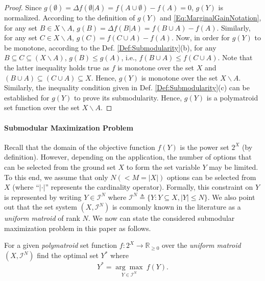 \documentclass[conference]{IEEEtran}
\newcommand{\R}{\mathbb{R}}
\begin{document}
\begin{proof}
Since $g(\emptyset)=\Delta f(\emptyset \vert A) = f(A\cup\emptyset)-f(A)=0$, $g(Y)$ is normalized. 
According to the definition of $g(Y)$ and \eqref{Eq:MarginalGainNotation}, for any set $B\in X \backslash A$, $g(B) = \Delta f(B\vert A) = f(B \cup A)-f(A)$. Similarly, for any set $C\in X\backslash A$, $g(C)=f(C\cup A)-f(A)$. 
Now, in order for $g(Y)$ to be monotone, according to the Def. \ref{Def:Submodularity}(b), for any $B\subseteq C\subseteq (X\backslash A)$,  $g(B)\leq g(A)$, i.e., $f(B\cup A) \leq f(C\cup A)$. Note that the latter inequality holds true as $f$ is monotone over the set $X$ and $(B\cup A) \subseteq (C\cup A) \subseteq X$. Hence, $g(Y)$ is monotone over the set $X \backslash A$. Similarly, the inequality condition given in Def. \ref{Def:Submodularity}(c) can be established for $g(Y)$ to prove its submodularity. Hence, $g(Y)$ is a polymatroid set function over the set $X \backslash A$. 
\end{proof}


\paragraph*{\textbf{Submodular Maximization Problem}}

Recall that the domain of the objective function $f(Y)$ is the power set $2^X$ (by definition). However, depending on the application, the number of options that can be selected from the ground set $X$ to form the set variable $Y$ may be limited. To this end, we assume that only $N(< M = \vert X \vert)$ options can be selected from $X$ (where ``$\vert \cdot \vert$'' represents the cardinality operator). Formally, this constraint on $Y$ is represented by writing $Y\in\mathcal{I}^N$ where $\mathcal{I}^N\triangleq \{Y:Y \subseteq X, \vert Y \vert \leq N\}$. We also point out that the set system $(X,\mathcal{I}^N)$ is commonly known in the literature \cite{Liu2018} as a \emph{uniform matroid} of rank $N$. We now can state the considered submodular maximization problem in this paper as follows. 

For a given \emph{polymatroid} set function $f:2^X\rightarrow \R_{\geq 0}$ over the \emph{uniform matroid} $(X,\mathcal{I}^N)$ find the optimal set $Y^*$ where  
\begin{equation}\label{Eq:SubmodularMaximizationProblem}
    Y^* = \underset{Y\in\mathcal{I}^N}{\arg\max} \ f(Y).
\end{equation}
\end{document}
